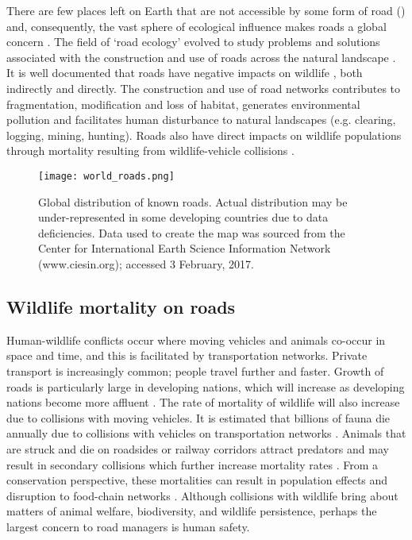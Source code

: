 There are few places left on Earth that are not accessible by some form of road () and, consequently, the vast sphere of ecological influence makes roads a global concern \citep{laur14}. The field of `road ecology' evolved to study problems and solutions associated with the construction and use of roads across the natural landscape \citep[see][]{form03}. It is well documented that roads have negative impacts on wildlife \citep{form98,spel98,rvdr15}, both indirectly and directly. The construction and use of road networks contributes to fragmentation, modification and loss of habitat, generates environmental pollution and facilitates human disturbance to natural landscapes (e.g. clearing, logging, mining, hunting). Roads also have direct impacts on wildlife populations through mortality resulting from wildlife-vehicle collisions \citep{fahr09}.

\begin{figure*}[!t]
  \centering
  \texttt{[image: world\_roads.png]}
  \caption[Global distribution of known roads]{Global distribution of known roads. Actual distribution may be under-represented in some developing countries due to data deficiencies. Data used to create the map was sourced from the Center for International Earth Science Information Network (www.ciesin.org); accessed 3 February, 2017.}
  \label{roads}
\end{figure*}

\subsection{Wildlife mortality on roads}

Human-wildlife conflicts occur where moving vehicles and animals co-occur in space and time, and this is facilitated by transportation networks. Private transport is increasingly common; people travel further and faster. Growth of roads is particularly large in developing nations, which will increase as developing nations become more affluent \citep{rvdr15}. The rate of mortality of wildlife will also increase due to collisions with moving vehicles. It is estimated that billions of fauna die annually due to collisions with vehicles on transportation networks \citep{seil06}. Animals that are struck and die on roadsides or railway corridors attract predators and may result in secondary collisions which further increase mortality rates \citep{spel98}. From a conservation perspective, these mortalities can result in population effects and disruption to food-chain networks \citep{ramp06b,cham10,pola14}.  Although collisions with wildlife bring about matters of animal welfare, biodiversity, and wildlife persistence, perhaps the largest concern to road managers is human safety. 

